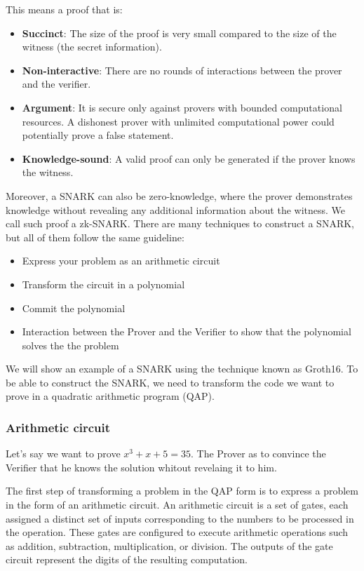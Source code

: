 This means a proof that is:
\begin{itemize}
\item \textbf{Succinct}: The size of the proof is very small compared to the size of the witness (the secret information).
\item \textbf{Non-interactive}: There are no rounds of interactions between the prover and the verifier.
\item \textbf{Argument}: It is secure only against provers with bounded computational resources. A dishonest prover with unlimited computational power could potentially prove a false statement.
\item \textbf{Knowledge-sound}: A valid proof can only be generated if the prover knows the witness. \cite{NZ20}
\end{itemize}

Moreover, a SNARK can also be zero-knowledge, where the prover demonstrates knowledge without revealing any additional information about the witness. We call such proof a zk-SNARK.
There are many techniques to construct a SNARK, but all of them follow the same guideline:
\begin{itemize}
   \item Express your problem as an arithmetic circuit
   \item Transform the circuit in a polynomial
   \item Commit the polynomial
   \item Interaction between the Prover and the Verifier to show that the polynomial solves the the problem
 \end{itemize}
 We will show an example of a SNARK using the technique known as Groth16\cite{GR16}.
To be able to construct the SNARK, we need to transform the code we want to prove in a quadratic arithmetic program (QAP).


\subsubsection{Arithmetic circuit}
\label{subsec:ac}

Let's say we want to prove $x^3+x+5=35$.
The Prover as to convince the Verifier that he knows the solution whitout revelaing it to him.

The first step of transforming a problem in the QAP form is to express a problem in the form of an arithmetic circuit.
An arithmetic circuit is a set of gates, each assigned a distinct set of inputs corresponding to the numbers to be processed in the operation.
These gates are configured to execute arithmetic operations such as addition, subtraction, multiplication, or division. The outputs of the gate circuit represent the digits of the resulting computation.

